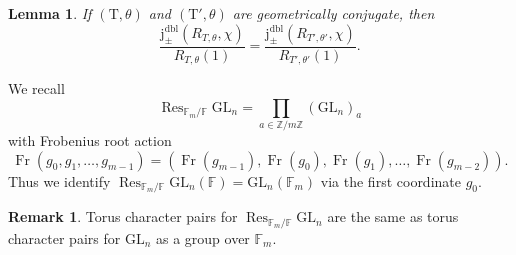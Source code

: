 \documentclass[12pt, reqno]{amsart}
\newtheorem{lemma}[theorem]{Lemma}
\theoremstyle{definition}
\theoremstyle{definition}
\newtheorem{remark}[theorem]{Remark}
\theoremstyle{definition}
\newcommand{\trace}{\operatorname{tr}}
\newcommand{\GL}{\mathrm{GL}}
\newcommand{\finiteField}{\mathbb{F}}
\newcommand{\finiteFieldExtension}[1]{\finiteField_{#1}}
\newcommand{\Frobenius}{\operatorname{Fr}}
\newcommand{\restrictionOfScalars}[3]{\operatorname{Res}_{#1 \slash #2}{#3}}
\newcommand{\dblVirtualJacobiSumScalar}[2]{\mathrm{j}_{\pm}^{\mathrm{dbl}}\left(#1, #2\right)}
\newcommand{\algebraicGroup}[1]{\boldsymbol{\mathrm{#1}}}
\newcommand{\calvin}[1]{\textcolor{orange}{\sffamily ((CALVIN: #1))}}
\begin{document}
\begin{lemma}
\label{lem:indep_geo_conj}
    If $(\algebraicGroup{T},\theta)$ and $(\algebraicGroup{T}', \theta)$ are geometrically conjugate, then $$\frac{\dblVirtualJacobiSumScalar{R_{T, \theta}}{\chi}}{R_{T,\theta}(1)} = \frac{\dblVirtualJacobiSumScalar{R_{T', \theta'}}{\chi}}{R_{T',\theta'}(1)}.$$
\end{lemma}

We recall\[
	\restrictionOfScalars{\finiteFieldExtension{m}}{\finiteField}{\algebraicGroup{\GL}_n} = \prod_{a \in \mathbb{Z}/m\mathbb{Z}} \left(\algebraicGroup{\GL}_n\right)_a
\]
with Frobenius root action $$\Frobenius(g_0,g_1, \hdots, g_{m-1}) = (\Frobenius(g_{m-1}), \Frobenius(g_0), \Frobenius(g_1), \hdots, \Frobenius(g_{m-2})).$$ Thus we identify $\restrictionOfScalars{\finiteFieldExtension{m}}{\finiteField}{\algebraicGroup{\GL}_n}(\finiteField) = \algebraicGroup{\GL}_n(\finiteFieldExtension{m})$ via the first coordinate $g_0$.

\begin{remark}
Torus character pairs for $\restrictionOfScalars{\finiteFieldExtension{m}}{\finiteField}{\algebraicGroup{\GL}_n}$ are the same as torus character pairs for $\algebraicGroup{\GL}_n$ as a group over $\finiteFieldExtension{m}$.
\end{remark}

\end{document}
